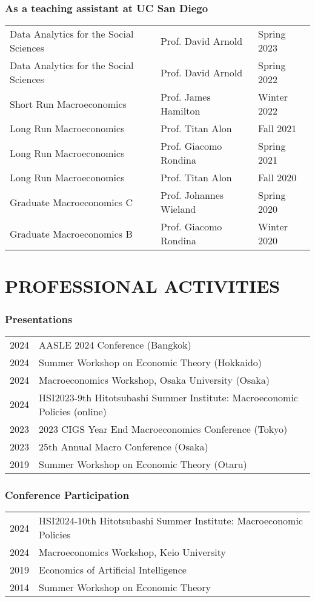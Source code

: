 \documentclass[12pt]{article}
\begin{document}
\subsubsection*{As a teaching assistant at UC San Diego}
\begin{tabular}{@{}lll}
Data Analytics for the Social Sciences&Prof. David Arnold&Spring 2023\\
Data Analytics for the Social Sciences&Prof. David Arnold&Spring 2022\\
Short Run Macroeconomics&Prof. James Hamilton&Winter 2022\\
Long Run Macroeconomics&Prof. Titan Alon&Fall 2021\\
Long Run Macroeconomics&Prof. Giacomo Rondina&Spring 2021\\
Long Run Macroeconomics&Prof. Titan Alon&Fall 2020\\
Graduate Macroeconomics C&Prof. Johannes Wieland&Spring 2020\\
Graduate Macroeconomics B&Prof. Giacomo Rondina&Winter 2020
\end{tabular}

\section*{PROFESSIONAL ACTIVITIES}
\subsubsection*{Presentations}
\begin{tabular}{@{}ll}
2024&AASLE 2024 Conference (Bangkok)\\
2024&Summer Workshop on Economic Theory (Hokkaido)\\
2024&Macroeconomics Workshop, Osaka University (Osaka)\\
2024&HSI2023-9th Hitotsubashi Summer Institute: Macroeconomic Policies (online)\\
2023&2023 CIGS Year End Macroeconomics Conference (Tokyo)\\
2023&25th Annual Macro Conference (Osaka)\\
2019&Summer Workshop on Economic Theory (Otaru)
\end{tabular}
\subsubsection*{Conference Participation}
\begin{tabular}{@{}ll}
2024&HSI2024-10th Hitotsubashi Summer Institute: Macroeconomic Policies\\
2024&Macroeconomics Workshop, Keio University\\
2019&Economics of Artificial Intelligence\\
2014&Summer Workshop on Economic Theory
\end{tabular}
\end{document}
